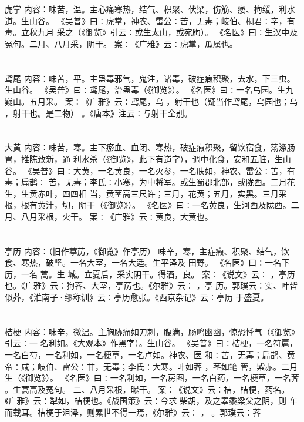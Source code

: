 \documentclass[12pt,UTF8]{ctexbook}
\begin{document}
\chapter{}虎掌
内容：味苦，温。主心痛寒热，结气、积聚、伏梁，伤筋、痿、拘缓，利水道。生山谷。 
《吴普》曰∶虎掌，神农、雷公∶苦，无毒；岐伯、桐君∶辛，有毒。立秋九月 
采之（《御览》引云∶或生太山，或宛朐）。 
《名医》曰∶生汉中及冤句。二月、八月采，阴干。 
案∶《广雅》云∶虎掌，瓜属也。 


\chapter{}鸢尾
内容：味苦，平。主蛊毒邪气，鬼注，诸毒，破症瘕积聚，去水，下三虫。生山谷。 
《吴普》曰∶鸢尾，治蛊毒（《御览》）。 
《名医》曰∶一名乌园。生九嶷山。五月采。 
案∶《广雅》云∶鸢尾，乌 ，射干也（疑当作鸢尾，乌园也；乌 ，射干也。是二物） 
。《唐本》注云∶与射干全别。 


\chapter{}大黄
内容：味苦，寒。主下瘀血、血闭、寒热，破症瘕积聚，留饮宿食，荡涤肠胃，推陈致新，通 
利水杀（《御览》，此下有道字），调中化食，安和五脏，生山谷。 
《吴普》曰∶大黄，一名黄良，一名火参，一名肤如，神农、雷公∶苦，有毒；扁鹊∶ 
苦，无毒；李氏∶小寒，为中将军。或生蜀郡北部，或陇西。二月花生，生黄赤叶，四四相 
当，黄茎高三尺许；三月，花黄；五月，实黑。三月采根，根有黄汁，切，阴干（《御览》）。 
《名医》曰∶一名黄良，生河西及陇西。二月、八月采根，火干。 
案∶《广雅》云∶黄良，大黄也。 


\chapter{}亭历
内容：（旧作葶苈，《御览》作亭历） 
味辛，寒，主症瘕、积聚、结气，饮食、寒热，破坚。一名大室，一名大适。生平泽及 
田野。 
《名医》曰∶一名下历，一名 蒿。生 城。立夏后，采实阴干。得酒，良。 
案∶《说文》云∶ ，亭历也。《广雅》云∶狗荠、大室，亭苈也。《尔雅》云∶ ，亭 
历。郭璞云∶实、叶皆似芥，《淮南子·缪称训》云∶亭历愈张。《西京杂记》云∶亭历 
于盛夏。 


\chapter{}桔梗
内容：味辛，微温。主胸胁痛如刀刺，腹满，肠鸣幽幽，惊恐悸气（《御览》引云∶一 
名利如。《大观本》作黑字）。生山谷。 
《吴普》曰∶桔梗，一名符扈，一名白芍，一名利如，一名梗草，一名卢如。神农、医 
和∶苦，无毒；扁鹊、黄帝∶咸；岐伯、雷公∶甘，无毒；李氏∶大寒。叶如荠 ，茎如笔 
管，紫赤。二月生（《御览》）。 
《名医》曰∶一名利如，一名房图，一名白药，一名梗草，一名荠 。生蒿高及冤句。 
二、八月采根，曝干。 
案∶《说文》云∶桔，桔梗，药名。《广雅》云∶犁如，桔梗也。《战国策》云∶今求 
柴胡，及之睾黍梁父之阴，则 车而载耳。桔梗于沮泽，则累世不得一焉，《尔雅》云∶ ， 
。郭璞云∶荠 
\end{document}
